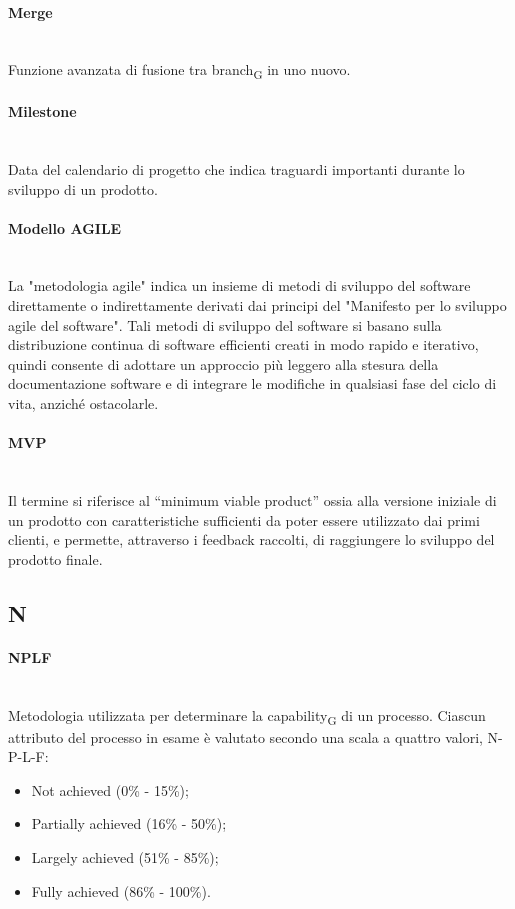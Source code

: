 \paragraph{Merge}~\smallskip \\
Funzione avanzata di fusione tra branch\textsubscript{G} in uno nuovo.

\paragraph{Milestone}~\smallskip \\
Data del calendario di progetto che indica traguardi importanti durante lo sviluppo di un prodotto.

\paragraph{Modello AGILE}~\smallskip \\
La "metodologia agile" indica un insieme di metodi di sviluppo del software direttamente o indirettamente derivati dai principi del "Manifesto per lo sviluppo agile del software".
Tali metodi di sviluppo del software si basano sulla distribuzione continua di software efficienti creati in modo rapido e iterativo, quindi
consente di adottare un approccio più leggero alla stesura della documentazione software e di integrare le modifiche in qualsiasi fase del ciclo di vita, anziché ostacolarle.

\paragraph{MVP}~\smallskip \\
Il termine si riferisce al “minimum viable product” ossia alla versione iniziale di un prodotto con 
caratteristiche sufficienti da poter essere utilizzato dai primi clienti, e permette, attraverso i feedback raccolti, di raggiungere lo sviluppo del prodotto finale.
\newpage
{}
\subsection*{N}
\paragraph{NPLF}~\smallskip \\
Metodologia utilizzata per determinare la capability\textsubscript{G} di un processo. Ciascun attributo del processo in esame è valutato secondo una scala a quattro valori, N-P-L-F:
\begin{itemize}
	\item Not achieved (0\% - 15\%);
	\item Partially achieved (16\% - 50\%);
	\item Largely achieved (51\% - 85\%);
    \item Fully achieved (86\% - 100\%).
\end{itemize}
\newpage
{}
